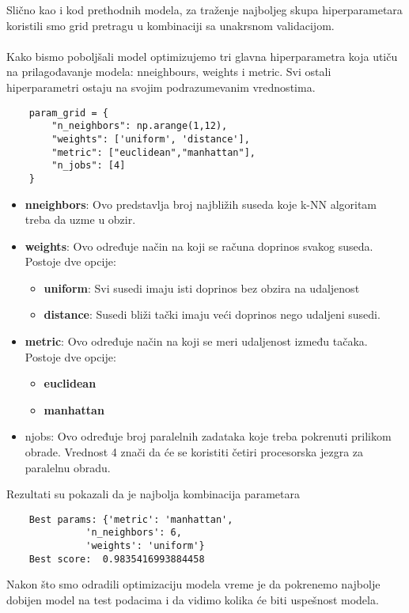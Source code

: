 \documentclass[a4paper,12pt]{article}
\begin{document}
Slično kao i kod prethodnih modela, za traženje najboljeg skupa hiperparametara koristili smo grid pretragu u kombinaciji sa unakrsnom validacijom.
\\\\Kako bismo poboljšali model optimizujemo tri glavna hiperparametra koja utiču na prilagođavanje modela: n\textunderscore neighbours, weights i metric. Svi ostali hiperparametri ostaju na svojim podrazumevanim vrednostima.
\begin{verbatim}
    param_grid = {
        "n_neighbors": np.arange(1,12),
        "weights": ['uniform', 'distance'],
        "metric": ["euclidean","manhattan"],
        "n_jobs": [4]
    }
\end{verbatim}
\begin{itemize}
    \item \textbf{n\textunderscore neighbors}: Ovo predstavlja broj najbližih suseda koje k-NN algoritam treba da uzme u obzir.
    \item \textbf{weights}: Ovo određuje način na koji se računa doprinos svakog suseda. Postoje dve opcije:
    \begin{itemize}
        \item \textbf{uniform}: Svi susedi imaju isti doprinos bez obzira na udaljenost
        \item \textbf{distance}: Susedi bliži tački imaju veći doprinos nego udaljeni susedi.
    \end{itemize}
    \item \textbf{metric}: Ovo određuje način na koji se meri udaljenost između tačaka. Postoje dve opcije:
    \begin{itemize}
        \item \textbf{euclidean}
        \item \textbf{manhattan}
    \end{itemize}
    \item n\textunderscore jobs: Ovo određuje broj paralelnih zadataka koje treba pokrenuti prilikom obrade. Vrednost 4 znači da će se koristiti četiri procesorska jezgra za paralelnu obradu.
\end{itemize}
Rezultati su pokazali da je najbolja kombinacija parametara
\begin{verbatim}
    Best params: {'metric': 'manhattan',
              'n_neighbors': 6,
              'weights': 'uniform'}
    Best score:  0.9835416993884458
\end{verbatim}

Nakon što smo odradili optimizaciju modela vreme je da pokrenemo najbolje dobijen model na test podacima i da vidimo kolika će biti uspešnost modela.
\end{document}

